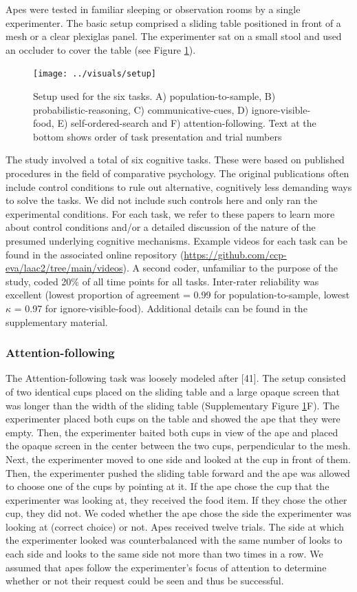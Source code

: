 \documentclass[
  man,floatsintext]{apa6}
\begin{document}
Apes were tested in familiar sleeping or observation rooms by a single experimenter. The basic setup comprised a sliding table positioned in front of a mesh or a clear plexiglas panel. The experimenter sat on a small stool and used an occluder to cover the table (see Figure \ref{fig:setup}).

\begin{figure}
\texttt{[image: ../visuals/setup]} \caption{Setup used for the six tasks. A) population-to-sample, B) probabilistic-reasoning, C) communicative-cues, D) ignore-visible-food, E) self-ordered-search and F) attention-following. Text at the bottom shows order of task presentation and trial numbers}\label{fig:setup}
\end{figure}

The study involved a total of six cognitive tasks. These were based on published procedures in the field of comparative psychology. The original publications often include control conditions to rule out alternative, cognitively less demanding ways to solve the tasks. We did not include such controls here and only ran the experimental conditions. For each task, we refer to these papers to learn more about control conditions and/or a detailed discussion of the nature of the presumed underlying cognitive mechanisms. Example videos for each task can be found in the associated online repository (\url{https://github.com/ccp-eva/laac2/tree/main/videos}). A second coder, unfamiliar to the purpose of the study, coded 20\% of all time points for all tasks. Inter-rater reliability was excellent (lowest proportion of agreement = 0.99 for population-to-sample, lowest \(\kappa\) = 0.97 for ignore-visible-food). Additional details can be found in the supplementary material.

\subsubsection{Attention-following}\label{attention-following}

The Attention-following task was loosely modeled after {[}41{]}. The setup consisted of two identical cups placed on the sliding table and a large opaque screen that was longer than the width of the sliding table (Supplementary Figure \ref{fig:setup}F). The experimenter placed both cups on the table and showed the ape that they were empty. Then, the experimenter baited both cups in view of the ape and placed the opaque screen in the center between the two cups, perpendicular to the mesh. Next, the experimenter moved to one side and looked at the cup in front of them. Then, the experimenter pushed the sliding table forward and the ape was allowed to choose one of the cups by pointing at it. If the ape chose the cup that the experimenter was looking at, they received the food item. If they chose the other cup, they did not. We coded whether the ape chose the side the experimenter was looking at (correct choice) or not. Apes received twelve trials. The side at which the experimenter looked was counterbalanced with the same number of looks to each side and looks to the same side not more than two times in a row. We assumed that apes follow the experimenter's focus of attention to determine whether or not their request could be seen and thus be successful.
\end{document}

